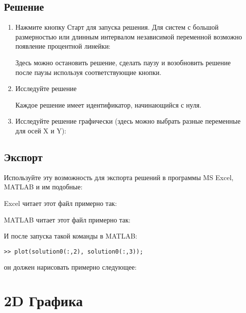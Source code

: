 \documentclass[12pt]{article}
\begin{document}
\subsection{Решение}
\begin{enumerate}
\item Нажмите кнопку Старт  
для запуска решения.
Для систем с большой размерностью или длинным интервалом независимой 
переменной возможно появление процентной линейки:


Здесь можно остановить решение, сделать паузу и возобновить решение после паузы
используя соответствующие кнопки.

\item Исследуйте решение


Каждое решение имеет идентификатор, начинающийся с нуля.

\item Исследуйте решение графически (здесь можно выбрать разные переменные для осей X и Y):


\end{enumerate}

\subsection{Экспорт}
Используйте эту возможность для экспорта решений в программы MS Excel, MATLAB и им подобные:


Excel читает этот файл примерно так:


MATLAB читает этот файл примерно так:


И после запуска такой команды в MATLAB:

\texttt{>{}> plot(solution0(:,2), solution0(:,3));}

он должен нарисовать примерно следующее:






\section{2D Графика}
\end{document}
